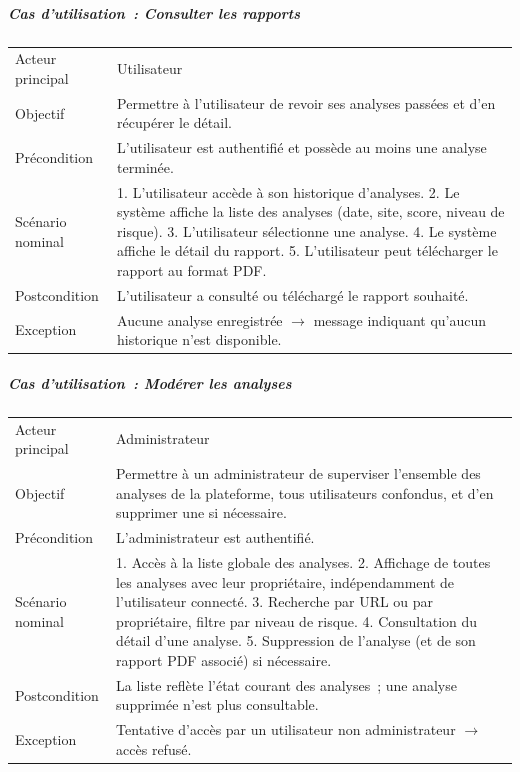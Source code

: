 \subparagraph{Cas d'utilisation~: Consulter les rapports}
\begin{table}[H]
  \centering
  \small
  \begin{tabular}{p{3.2cm}p{9.5cm}}
    \toprule
    Acteur principal & Utilisateur \\
    Objectif & Permettre \`a l'utilisateur de revoir ses analyses pass\'ees et d'en r\'ecup\'erer le d\'etail. \\
    Pr\'econdition & L'utilisateur est authentifi\'e et poss\`ede au moins une analyse termin\'ee. \\
    Sc\'enario nominal &
      1. L'utilisateur acc\`ede \`a son historique d'analyses.
      2. Le syst\`eme affiche la liste des analyses (date, site, score, niveau de risque).
      3. L'utilisateur s\'electionne une analyse.
      4. Le syst\`eme affiche le d\'etail du rapport.
      5. L'utilisateur peut t\'el\'echarger le rapport au format PDF. \\
    Postcondition & L'utilisateur a consult\'e ou t\'el\'echarg\'e le rapport souhait\'e. \\
    Exception & Aucune analyse enregistr\'ee $\rightarrow$ message indiquant qu'aucun historique n'est disponible. \\
    \bottomrule
  \end{tabular}
\end{table}

\subparagraph{Cas d'utilisation~: Mod\'erer les analyses}
\begin{table}[H]
  \centering
  \small
  \begin{tabular}{p{3.2cm}p{9.5cm}}
    \toprule
    Acteur principal & Administrateur \\
    Objectif & Permettre \`a un administrateur de superviser l'ensemble des analyses de la plateforme, tous utilisateurs confondus, et d'en supprimer une si n\'ecessaire. \\
    Pr\'econdition & L'administrateur est authentifi\'e. \\
    Sc\'enario nominal &
      1. Acc\`es \`a la liste globale des analyses.
      2. Affichage de toutes les analyses avec leur propri\'etaire, ind\'ependamment de l'utilisateur connect\'e.
      3. Recherche par URL ou par propri\'etaire, filtre par niveau de risque.
      4. Consultation du d\'etail d'une analyse.
      5. Suppression de l'analyse (et de son rapport PDF associ\'e) si n\'ecessaire. \\
    Postcondition & La liste refl\`ete l'\'etat courant des analyses~; une analyse supprim\'ee n'est plus consultable. \\
    Exception & Tentative d'acc\`es par un utilisateur non administrateur $\rightarrow$ acc\`es refus\'e. \\
    \bottomrule
  \end{tabular}
\end{table}

